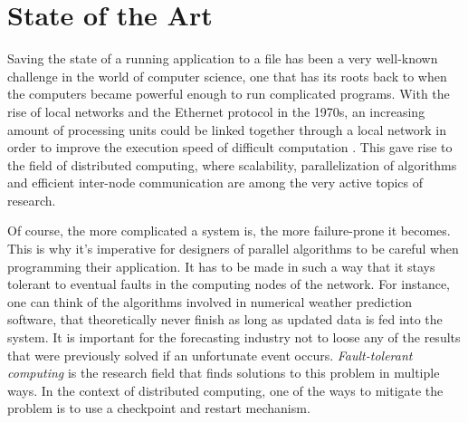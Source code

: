 {
\setlength{\parindent}{2em}
\chapter{State of the Art}\label{cha:state-of-the-art}
Saving the state of a running application to a file has been a very well-known challenge in the world of computer science, one that has its roots back to when the computers became powerful enough to run complicated programs. With the rise of local networks and the Ethernet protocol in the 1970s, an increasing amount of processing units could be linked together through a local network in order to improve the execution speed of difficult computation \cite{book:andrews}. This gave rise to the field of distributed computing, where scalability, parallelization of algorithms and efficient inter-node communication are among the very active topics of research.

Of course, the more complicated a system is, the more failure-prone it becomes. This is why it's imperative for designers of parallel algorithms to be careful when programming their application. It has to be made in such a way that it stays tolerant to eventual faults in the computing nodes of the network. For instance, one can think of the algorithms involved in numerical weather prediction software, that theoretically never finish as long as updated data is fed into the system. It is important for the forecasting industry not to loose any of the results that were previously solved if an unfortunate event occurs. \textit{Fault-tolerant computing} is the research field that finds solutions to this problem in multiple ways. In the context of distributed computing, one of the ways to mitigate the problem is to use a checkpoint and restart mechanism.

}
